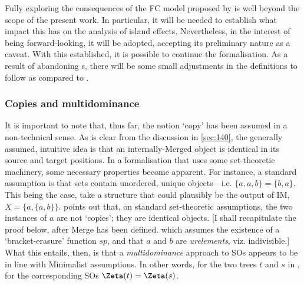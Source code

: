 Fully exploring the consequences of the FC model proposed by \textcite{ChomskyN_2021} is well beyond the scope of the present work. In particular, it will be needed to establish what impact this has on the analysis of island effects. Nevertheless, in the interest of being forward-looking, it will be adopted, accepting its preliminary nature as a caveat. With this established, it is possible to continue the formalisation. As a result of abandoning \LIk s, there will be some small adjustments in the definitions to follow as compared to \CS.

\subsubsection{Copies and multidominance}\label{sec:422}

It is important to note that, thus far, the notion `copy' has been assumed in a non-technical sense. As is clear from the discussion in \autoref{sec:140}, the generally assumed, intuitive idea is that an internally-Merged object is identical in its source and target positions. In a formalisation that uses some set-theoretic machinery, some necessary properties become apparent. For instance, a standard assumption is that sets contain unordered, unique objects---i.e. $\{a, a, b\}=\{b, a\}$. This being the case, take a structure that could plausibly be the output of IM, $X=\{a, \{a, b\}\}$. \textcite{GartnerHM_2022} points out that, on standard set-theoretic assumptions, the two instances of $a$ are not `copies'; they are identical objects. [I shall recapitulate the proof below, after Merge has been defined. which assumes the existence of a `bracket-erasure' function $sp$, and that $a$ and $b$ are \textit{urelements}, viz. indivisible.] What this entails, then, is that a \textit{multidominance} approach \parencite{CitkoB_2011, CitkoB_2011a} to SOs appears to be in line with Minimalist assumptions. In other words, for the two trees $t$ and $s$ in , for the corresponding SOs $\Zeta(t)=\Zeta(s)$.

